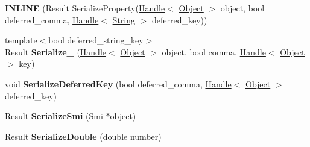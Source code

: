 \begin{DoxyCompactItemize}
\item 
{\bfseries I\+N\+L\+I\+NE} (Result Serialize\+Property(\hyperlink{classv8_1_1internal_1_1_handle}{Handle}$<$ \hyperlink{classv8_1_1internal_1_1_object}{Object} $>$ object,                                                                                                                               bool deferred\+\_\+comma,                                                                                                                               \hyperlink{classv8_1_1internal_1_1_handle}{Handle}$<$ \hyperlink{classv8_1_1internal_1_1_string}{String} $>$ deferred\+\_\+key))\hypertarget{classv8_1_1internal_1_1_b_a_s_e___e_m_b_e_d_d_e_d_abe205f90aa4f9116cefe2ac95d765be7}{}\label{classv8_1_1internal_1_1_b_a_s_e___e_m_b_e_d_d_e_d_abe205f90aa4f9116cefe2ac95d765be7}

\item 
{\footnotesize template$<$bool deferred\+\_\+string\+\_\+key$>$ }\\Result {\bfseries Serialize\+\_\+} (\hyperlink{classv8_1_1internal_1_1_handle}{Handle}$<$ \hyperlink{classv8_1_1internal_1_1_object}{Object} $>$ object, bool comma, \hyperlink{classv8_1_1internal_1_1_handle}{Handle}$<$ \hyperlink{classv8_1_1internal_1_1_object}{Object} $>$ key)\hypertarget{classv8_1_1internal_1_1_b_a_s_e___e_m_b_e_d_d_e_d_a6005fc146cf6d573c44fe8e46b319081}{}\label{classv8_1_1internal_1_1_b_a_s_e___e_m_b_e_d_d_e_d_a6005fc146cf6d573c44fe8e46b319081}

\item 
void {\bfseries Serialize\+Deferred\+Key} (bool deferred\+\_\+comma, \hyperlink{classv8_1_1internal_1_1_handle}{Handle}$<$ \hyperlink{classv8_1_1internal_1_1_object}{Object} $>$ deferred\+\_\+key)\hypertarget{classv8_1_1internal_1_1_b_a_s_e___e_m_b_e_d_d_e_d_a0becfeedfed7af6537086b78f1fa6d42}{}\label{classv8_1_1internal_1_1_b_a_s_e___e_m_b_e_d_d_e_d_a0becfeedfed7af6537086b78f1fa6d42}

\item 
Result {\bfseries Serialize\+Smi} (\hyperlink{classv8_1_1internal_1_1_smi}{Smi} $\ast$object)\hypertarget{classv8_1_1internal_1_1_b_a_s_e___e_m_b_e_d_d_e_d_a877ac7b86bdc3c302ca6d9366a03080a}{}\label{classv8_1_1internal_1_1_b_a_s_e___e_m_b_e_d_d_e_d_a877ac7b86bdc3c302ca6d9366a03080a}

\item 
Result {\bfseries Serialize\+Double} (double number)\hypertarget{classv8_1_1internal_1_1_b_a_s_e___e_m_b_e_d_d_e_d_acc701c1dbac0a9bc1a6a3f67cfee14dc}{}\label{classv8_1_1internal_1_1_b_a_s_e___e_m_b_e_d_d_e_d_acc701c1dbac0a9bc1a6a3f67cfee14dc}


\end{DoxyCompactItemize}
